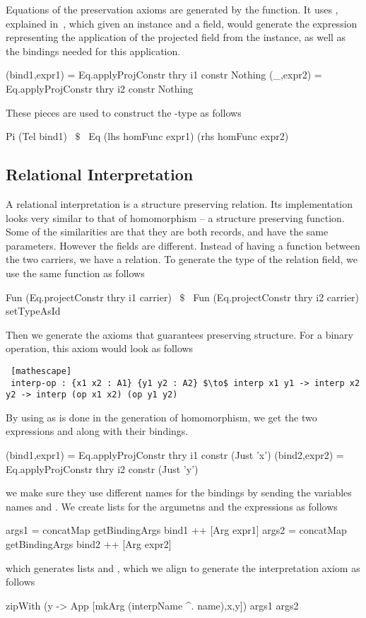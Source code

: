 Equations of the preservation axioms are generated by the  function. It uses , explained in~, which given an instance and a field, would generate the expression representing the application of the projected field from the instance, as well as the bindings needed for this application. 
\begin{hscode} 
(bind1,expr1) = Eq.applyProjConstr thry i1 constr Nothing
     (_,expr2) = Eq.applyProjConstr thry i2 constr Nothing 
\end{hscode} 
These pieces are used to construct the -type as follows 
\begin{hscode}
Pi (Tel bind1) ~$\$$~ Eq (lhs homFunc expr1) (rhs homFunc expr2)
\end{hscode} 

\subsection{Relational Interpretation}
\label{sec:generation:relInterp}
A relational interpretation is a structure preserving relation. Its implementation looks very similar to that of homomorphism -- a structure preserving function. Some of the similarities are that they are both records, and have the same parameters. However the fields are different. Instead of having a function between the two carriers, we have a relation. To generate the type of the relation field, we use the same function  as follows 
\begin{hscode} 
Fun (Eq.projectConstr thry i1 carrier) ~$\$$~ 
     Fun (Eq.projectConstr thry i2 carrier) setTypeAsId
\end{hscode} 
Then we generate the axioms that guarantees preserving structure. For a binary operation, this axiom would look as follows 
\begin{lstlisting} [mathescape]
 interp-op : {x1 x2 : A1} {y1 y2 : A2} $\to$ interp x1 y1 -> interp x2 y2 -> interp (op x1 x2) (op y1 y2)
\end{lstlisting}
By using  as is done in the generation of homomorphism, we get the two expressions  and  along with their bindings. 
\begin{hscode}  
 (bind1,expr1) = Eq.applyProjConstr thry i1 constr (Just 'x')
 (bind2,expr2) = Eq.applyProjConstr thry i2 constr (Just 'y')
\end{hscode} 
we make sure they use different names for the bindings by sending the variables names  and . 
We create lists for the argumetns and the expressions as follows 
\begin{hscode} 
 args1 = concatMap getBindingArgs bind1 ++ [Arg expr1] 
 args2 = concatMap getBindingArgs bind2 ++ [Arg expr2]
\end{hscode} 
which generates lists \lstmath{[x1,x2,op x1 x2]} and \lstmath{[y1,y2,op y1 y2]}, which we align to generate the interpretation axiom as follows 
\begin{hscode} 
 zipWith (\x y -> App [mkArg (interpName ^. name),x,y]) args1 args2 
\end{hscode}

